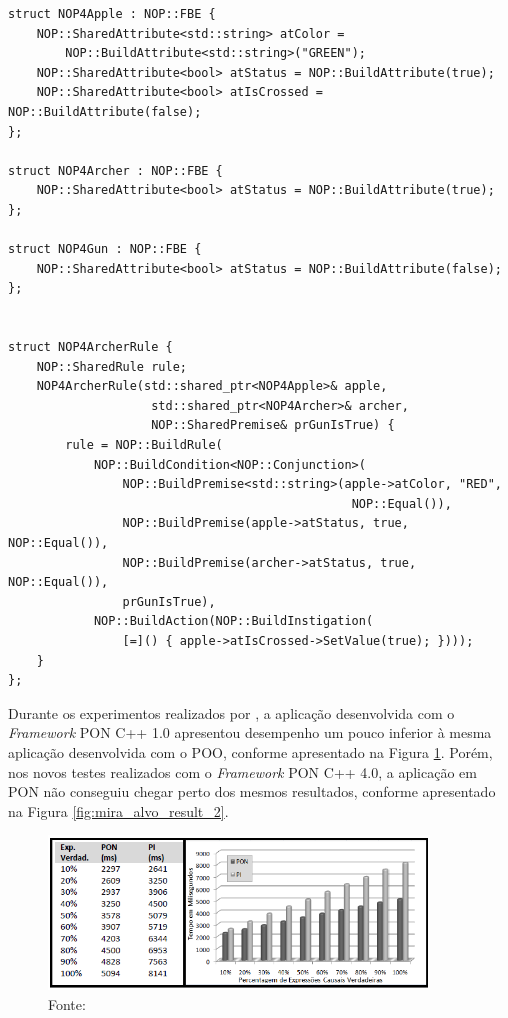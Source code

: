 \begin{lstlisting}[caption = {Código da estrutura do mira ao alvo com o \textit{Framework} PON C++ 4.0},
source = {Autoria própria},
label = {cod:mira_alvo}]
struct NOP4Apple : NOP::FBE {
    NOP::SharedAttribute<std::string> atColor =
        NOP::BuildAttribute<std::string>("GREEN");
    NOP::SharedAttribute<bool> atStatus = NOP::BuildAttribute(true);
    NOP::SharedAttribute<bool> atIsCrossed = NOP::BuildAttribute(false);
};

struct NOP4Archer : NOP::FBE {
    NOP::SharedAttribute<bool> atStatus = NOP::BuildAttribute(true);
};

struct NOP4Gun : NOP::FBE {
    NOP::SharedAttribute<bool> atStatus = NOP::BuildAttribute(false);
};


struct NOP4ArcherRule {
    NOP::SharedRule rule;    
    NOP4ArcherRule(std::shared_ptr<NOP4Apple>& apple,
                    std::shared_ptr<NOP4Archer>& archer,
                    NOP::SharedPremise& prGunIsTrue) {
        rule = NOP::BuildRule(
            NOP::BuildCondition<NOP::Conjunction>(
                NOP::BuildPremise<std::string>(apple->atColor, "RED",
                                                NOP::Equal()),
                NOP::BuildPremise(apple->atStatus, true, NOP::Equal()),
                NOP::BuildPremise(archer->atStatus, true, NOP::Equal()),
                prGunIsTrue),
            NOP::BuildAction(NOP::BuildInstigation(
                [=]() { apple->atIsCrossed->SetValue(true); })));
    }
};
\end{lstlisting}

Durante os experimentos realizados por , a
aplicação desenvolvida com o \textit{Framework} PON C++ 1.0 apresentou
desempenho um pouco inferior à mesma aplicação desenvolvida com o POO, conforme
apresentado na Figura \ref{fig:mira_alvo_result}. Porém, nos novos testes
realizados com o \textit{Framework} PON C++ 4.0, a aplicação em PON não
conseguiu chegar perto dos mesmos resultados, conforme apresentado na Figura
\ref{fig:mira_alvo_result_2}.

\begin{figure}[!htb]
\centering
\includegraphics[width=0.9\textwidth]{../figures/mira_alvo_result.PNG}
\smallskip
\caption{Resultado do experimento mira ao alvo com o \textit{Framework PON C++ 1.0}}
\caption*{Fonte: }
\label{fig:mira_alvo_result}
\end{figure}


